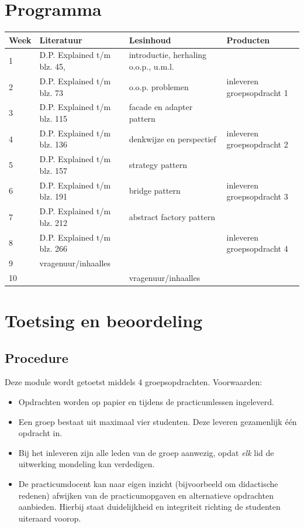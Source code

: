 \documentclass[titlepage,a4paper, 11pt]{article}
\begin{document}
\section{Programma}

\begin{tabular}{|p{1cm}|p{4cm}|p{4cm}|p{4cm}|}
\hline
Week&Literatuur&Lesinhoud&Producten\\
\hline
1&D.P. Explained t/m blz. 45,&introductie, herhaling o.o.p., u.m.l.&\\
\hline
2&D.P. Explained t/m blz. 73&o.o.p. problemen&inleveren groepsopdracht 1\\
\hline
3&D.P. Explained t/m blz. 115&facade en adapter pattern&\\
\hline
4&D.P. Explained t/m blz. 136&denkwijze en perspectief&inleveren groepsopdracht 2\\
\hline
5&D.P. Explained t/m blz. 157&strategy pattern&\\
\hline
6&D.P. Explained t/m blz. 191&bridge pattern&inleveren groepsopdracht 3\\
\hline
7&D.P. Explained t/m blz. 212&abstract factory pattern&\\
\hline
8&D.P. Explained t/m blz. 266 &&inleveren groepsopdracht 4\\
\hline
9&vragenuur/inhaalles&&\\
\hline
10&&vragenuur/inhaalles&\\
\hline
\end{tabular}
\section{Toetsing en beoordeling}
\subsection{Procedure}
Deze module wordt getoetst middels 4 groepsopdrachten. Voorwaarden:
\begin{itemize}
\item Opdrachten worden op papier en tijdens de practicumlessen ingeleverd.
\item Een groep bestaat uit maximaal vier studenten. Deze leveren gezamenlijk \'e\'en opdracht in.
\item Bij het inleveren zijn alle leden van de groep aanwezig, opdat \emph{elk} lid de uitwerking mondeling kan verdedigen.
\item De practicumdocent kan naar eigen inzicht (bijvoorbeeld om didactische redenen) afwijken van de practicumopgaven en alternatieve opdrachten aanbieden. Hierbij staat duidelijkheid en integriteit richting de studenten uiteraard voorop. 
\end{itemize}
\newpage
\end{document}
